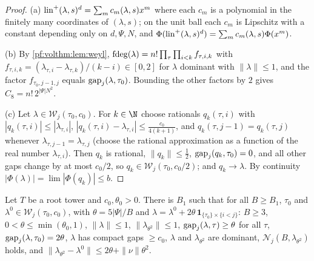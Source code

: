 \begin{proof}
(a) $\mathrm{lin}^+(\lambda,s)^d=\sum_m c_m(\lambda,s)x^m$ where each $c_m$ is a polynomial in the finitely many
coordinates of $(\lambda,s)$; on the unit ball each $c_m$ is Lipschitz with a constant depending only on
$d,\Psi,N$, and $\Phi(\mathrm{lin}^+(\lambda,s)^d)=\sum_mc_m(\lambda,s)\Phi(x^m)$.

(b) By \cref{pf:volthm:lem:weyl}, $\mathrm{fdeg}(\lambda)=n!\prod_{\tau}\prod_{i<k}f_{\tau,i,k}$ with
$f_{\tau,i,k}=(\lambda_{\tau,i}-\lambda_{\tau,k})/(k-i)\in[0,2]$ for $\lambda$ dominant with $\|\lambda\|\le1$,
and the factor $f_{\tau_0,j-1,j}$ equals $\mathrm{gap}_j(\lambda,\tau_0)$. Bounding the other factors by $2$ gives
$C_8=n!\,2^{|\Psi|N^2}$.

(c) Let $\lambda\in\mathcal W_j(\tau_0,c_0)$. For $k\in\N$ choose rationals $q_k(\tau,i)$ with
$|q_k(\tau,i)|\le|\lambda_{\tau,i}|$, $|q_k(\tau,i)-\lambda_{\tau,i}|\le\frac{c_0}{4(k+1)}$, and
$q_k(\tau,j-1)=q_k(\tau,j)$ whenever $\lambda_{\tau,j-1}=\lambda_{\tau,j}$ (choose the rational approximation as
a function of the real number $\lambda_{\tau,i}$). Then $q_k$ is rational, $\|q_k\|\le\frac12$,
$\mathrm{gap}_j(q_k,\tau_0)=0$, and all other gaps change by at most $c_0/2$, so
$q_k\in\mathcal W_j(\tau_0,c_0/2)$; and $q_k\to\lambda$. By continuity $|\Phi(\lambda)|=\lim|\Phi(q_k)|\le b$.
\end{proof}

\begin{lemma}\label{pf:volthm:lem:perturb}
Let $T$ be a root tower and $c_0,\theta_0>0$. There is $B_1$ such that for all $B\ge B_1$, $\tau_0$ and
$\lambda^0\in\mathcal W_j(\tau_0,c_0)$, with $\theta=5|\Psi|/B$ and
$\lambda=\lambda^0+2\theta\,\mathbf 1_{\{\tau_0\}\times\{i<j\}}$: $B\ge3$, $0<\theta\le\min(\theta_0,1)$,
$\|\lambda\|\le1$, $\|\lambda_{\theta^2}\|\le1$, $\mathrm{gap}_j(\lambda,\tau)\ge\theta$ for all $\tau$,
$\mathrm{gap}_j(\lambda,\tau_0)=2\theta$, $\lambda$ has compact gaps $\ge c_0$, $\lambda$ and $\lambda_{\theta^2}$ are
dominant, $\mathcal N_j(B,\lambda_{\theta^2})$ holds, and
$\|\lambda_{\theta^2}-\lambda^0\|\le2\theta+\|\nu\|\theta^2$.
\end{lemma}

